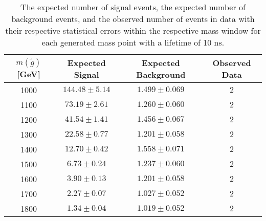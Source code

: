 \begin{table}[!htbp]
  \begin{center}
    \begin{tabular}{cccc}
      \hline
      $m(\tilde{g})$ [GeV]  & Expected Signal & Expected Background & Observed Data\\ 
      \hline
      1000    & $144.48 \pm 5.14 $ & $1.499 \pm 0.069 $ & $2$ \\
      1100    & $73.19 \pm 2.61 $ & $1.260 \pm 0.060 $ &  $2$ \\
      1200    & $41.54 \pm 1.41 $ & $1.456 \pm 0.067 $ &  $2$ \\
      1300    & $22.58 \pm 0.77 $ & $1.201 \pm 0.058 $ &  $2$ \\
      1400    & $12.70 \pm 0.42 $ & $1.558 \pm 0.071 $ &  $2$ \\
      1500    & $6.73 \pm 0.24 $ & $1.237 \pm 0.060 $ &   $2$ \\
      1600    & $3.90 \pm 0.13 $ & $1.201 \pm 0.058 $ &   $2$ \\
      1700    & $2.27 \pm 0.07 $ & $1.027 \pm 0.052 $ &   $2$ \\
      1800    & $1.34 \pm 0.04 $ & $1.019 \pm 0.052 $ &   $2$ \\
      \hline
    \end{tabular}
  \end{center}
  \caption{The expected number of signal events, the expected number of background events, and the observed number of events in data with their respective statistical errors within the respective mass window for each generated mass point with a lifetime of 10 ns.}
  \label{tab:app_counts_10ns}
\end{table}


